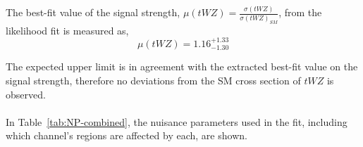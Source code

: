 The best-fit value of the signal strength, $\mu (tWZ)= \frac{\sigma(tWZ)}{\sigma(tWZ)_{SM}}$, from the likelihood fit is measured as,
\begin{equation}
  \mu (tWZ) =   1.16^{+1.33}_{-1.30}
\end{equation}

The expected upper limit is in agreement with the extracted best-fit value on the signal strength, therefore no deviations from the SM cross section of $tWZ$ is observed.\\\\

In Table~\ref{tab:NP-combined}, the nuisance parameters used in the fit, including which channel's regions are affected by each, are shown.
\begin{table}[]
\footnotesize
{}
\end{table}

